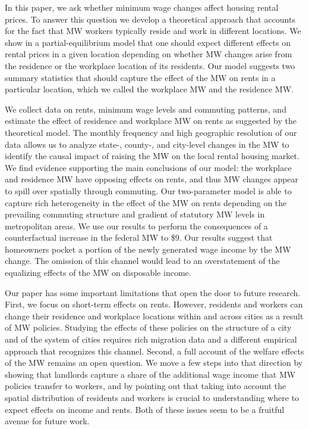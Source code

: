 
In this paper, we ask whether minimum wage changes affect housing rental prices.
To answer this question we develop a theoretical approach that accounts for
the fact that MW workers typically reside and work in different locations.
We show in a partial-equilibrium model that one should expect different effects
on rental prices in a given location depending on whether MW changes arise from 
the residence or the workplace location of its residents.
Our model suggests two summary statistics that should capture the effect of 
the MW on rents in a particular location, which we called the workplace MW and 
the residence MW.

We collect data on rents, minimum wage levels and commuting patterns, and
estimate the effect of residence and workplace MW on rents as suggested by
the theoretical model.
The monthly frequency and high geographic resolution of our data allows us to 
analyze state-, county-, and city-level changes in the MW to identify the causal 
impact of raising the MW on the local rental housing market.
We find evidence supporting the main conclusions of our model: the workplace and 
residence MW have opposing effects on rents, and thus MW changes appear to 
spill over spatially through commuting.
Our two-parameter model is able to capture rich heterogeneity in the effect 
of the MW on rents depending on the prevailing commuting structure and 
gradient of statutory MW levels in metropolitan areas.
We use our results to perform the consequences of a counterfactual increase 
in the federal MW to \$9.
Our results suggest that homeowners pocket a portion of the newly generated 
wage income by the MW change.
The omission of this channel would lead to an overstatement of the equalizing 
effects of the MW on disposable income.

Our paper has some important limitations that open the door to future research.
First, we focus on short-term effects on rents.
However, residents and workers can change their residence and workplace 
locations within and across cities as a result of MW policies.
Studying the effects of these policies on the structure of a city and of the 
system of cities requires rich migration data and a different empirical approach
that recognizes this channel.
Second, a full account of the welfare effects of the MW remains an open question.
We move a few steps into that direction by showing that landlords capture a 
share of the additional wage income that MW policies transfer to workers, and 
by pointing out that taking into account the spatial distribution of residents 
and workers is crucial to understanding where to expect effects on income and 
rents.
Both of these issues seem to be a fruitful avenue for future work.
